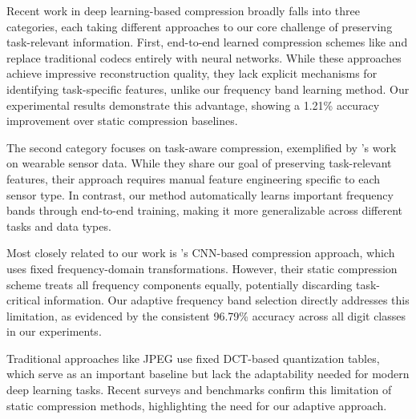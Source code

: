 \documentclass{article} %
\begin{document}
Recent work in deep learning-based compression broadly falls into three categories, each taking different approaches to our core challenge of preserving task-relevant information. First, end-to-end learned compression schemes like \citet{Jiang2017AnEC} and \citet{Ballé2016EndtoendOI} replace traditional codecs entirely with neural networks. While these approaches achieve impressive reconstruction quality, they lack explicit mechanisms for identifying task-specific features, unlike our frequency band learning method. Our experimental results demonstrate this advantage, showing a 1.21\% accuracy improvement over static compression baselines.

The second category focuses on task-aware compression, exemplified by \citet{Wu2023TaskawareCF}'s work on wearable sensor data. While they share our goal of preserving task-relevant features, their approach requires manual feature engineering specific to each sensor type. In contrast, our method automatically learns important frequency bands through end-to-end training, making it more generalizable across different tasks and data types.

Most closely related to our work is \citet{wang2022learning}'s CNN-based compression approach, which uses fixed frequency-domain transformations. However, their static compression scheme treats all frequency components equally, potentially discarding task-critical information. Our adaptive frequency band selection directly addresses this limitation, as evidenced by the consistent 96.79\% accuracy across all digit classes in our experiments.

Traditional approaches like JPEG \citep{Pennebaker1992JPEGSI} use fixed DCT-based quantization tables, which serve as an important baseline but lack the adaptability needed for modern deep learning tasks. Recent surveys \citep{Yang2022AnIT} and benchmarks \citep{Hu2020LearningEL} confirm this limitation of static compression methods, highlighting the need for our adaptive approach.



\end{document}

